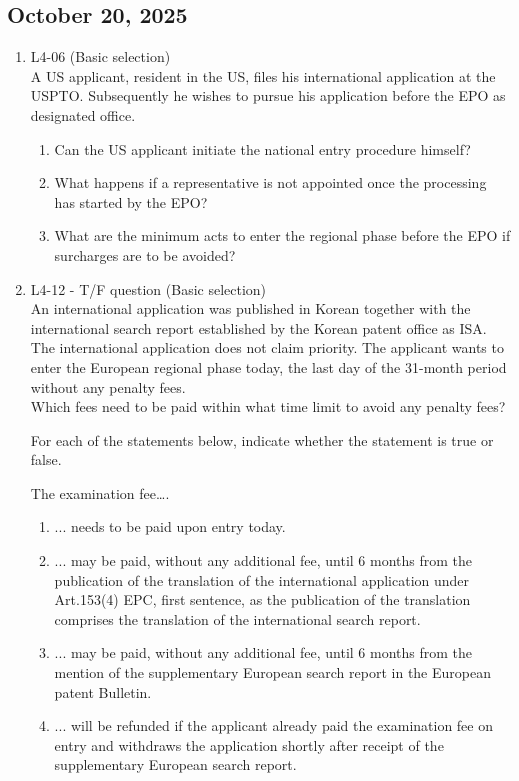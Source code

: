 \documentclass{report}
\begin{document}
\begin{enumerate}[label=\textbf{Answer \arabic*}]
    \section{October 20, 2025}

\begin{enumerate}[label=\textbf{Answer \arabic*}]

    \item %
    L4-06 (Basic selection) \\
    A US applicant, resident in the US, files his international application at the USPTO. Subsequently he wishes to pursue his application before the EPO as designated office.
    \begin{enumerate}[label=(\alph*)]
        \item Can the US applicant initiate the national entry procedure himself?
        \item What happens if a representative is not appointed once the processing has started by the EPO?
        \item What are the minimum acts to enter the regional phase before the EPO if surcharges are to be avoided?
    \end{enumerate}

    \item %
    L4-12 - T/F question (Basic selection) \\
    An international application was published in Korean together with the international search report established by the Korean patent office as ISA. The international application does not claim priority. The applicant wants to enter the European regional phase today, the last day of the 31-month period without any penalty fees. \\
    Which fees need to be paid within what time limit to avoid any penalty fees?

    \vspace{1em}
    For each of the statements below, indicate whether the statement is true or false.
    
    \vspace{0.5em}
    The examination fee….
    \begin{enumerate}[label=(\alph*)]
        \item ... needs to be paid upon entry today.
        \item ... may be paid, without any additional fee, until 6 months from the publication of the translation of the international application under Art.153(4) EPC, first sentence, as the publication of the translation comprises the translation of the international search report.
        \item ... may be paid, without any additional fee, until 6 months from the mention of the supplementary European search report in the European patent Bulletin.
        \item ... will be refunded if the applicant already paid the examination fee on entry and withdraws the application shortly after receipt of the supplementary European search report.
    \end{enumerate}


\end{enumerate}
\end{enumerate}
\end{document}
